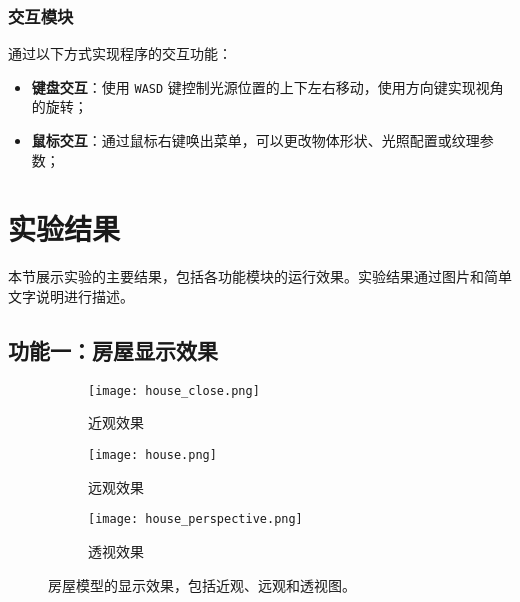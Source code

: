 \documentclass[11pt,a4paper]{article}
\begin{document}
\subsubsection{交互模块}
通过以下方式实现程序的交互功能：
\begin{itemize}
    \item \textbf{键盘交互}：使用 \texttt{WASD} 键控制光源位置的上下左右移动，使用方向键实现视角的旋转；
    \item \textbf{鼠标交互}：通过鼠标右键唤出菜单，可以更改物体形状、光照配置或纹理参数；
\end{itemize}


\section{实验结果}

本节展示实验的主要结果，包括各功能模块的运行效果。实验结果通过图片和简单文字说明进行描述。

\subsection{功能一：房屋显示效果}
\begin{figure}[H]
    \centering
    \begin{subfigure}[b]{0.32\textwidth}
        \centering
        \texttt{[image: house\_close.png]} %
        \caption{近观效果}
        \label{fig:house_close}
    \end{subfigure}
    \hfill
    \begin{subfigure}[b]{0.32\textwidth}
        \centering
        \texttt{[image: house.png]} %
        \caption{远观效果}
        \label{fig:house_far}
    \end{subfigure}
    \hfill
    \begin{subfigure}[b]{0.32\textwidth}
        \centering
        \texttt{[image: house\_perspective.png]} %
        \caption{透视效果}
        \label{fig:house_perspective}
    \end{subfigure}
    \caption{房屋模型的显示效果，包括近观、远观和透视图。}
    \label{fig:house_display}
\end{figure}
\end{document}
